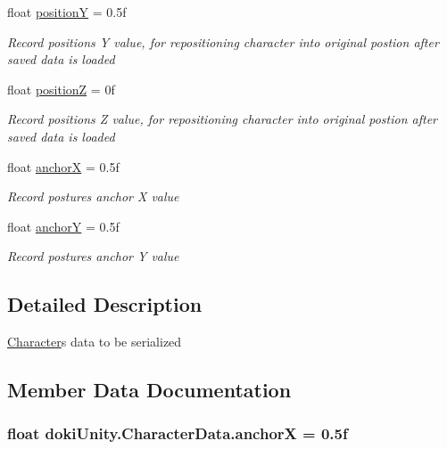 \begin{DoxyCompactItemize}
float \hyperlink{classdoki_unity_1_1_character_data_a737106f39a00a47969ef0eb9bc9ca687}{positionY} = 0.\+5f
\begin{DoxyCompactList}\small\item\em Record position\textquotesingle{}s Y value, for repositioning character into original postion after saved data is loaded \end{DoxyCompactList}\item 
float \hyperlink{classdoki_unity_1_1_character_data_a63d642bed2b900c80aa6d303782085e9}{positionZ} = 0f
\begin{DoxyCompactList}\small\item\em Record position\textquotesingle{}s Z value, for repositioning character into original postion after saved data is loaded \end{DoxyCompactList}\item 
float \hyperlink{classdoki_unity_1_1_character_data_a0a14e7430b02aa91c479c219b544b4ae}{anchorX} = 0.\+5f
\begin{DoxyCompactList}\small\item\em Record posture\textquotesingle{}s anchor X value \end{DoxyCompactList}\item 
float \hyperlink{classdoki_unity_1_1_character_data_a2051701b408778e685f524449be94ffd}{anchorY} = 0.\+5f
\begin{DoxyCompactList}\small\item\em Record posture\textquotesingle{}s anchor Y value \end{DoxyCompactList}\end{DoxyCompactItemize}


\subsection{Detailed Description}
\hyperlink{classdoki_unity_1_1_character}{Character}\textquotesingle{}s data to be serialized 



\subsection{Member Data Documentation}
\subsubsection[{\texorpdfstring{anchorX}{anchorX}}]{\setlength{\rightskip}{0pt plus 5cm}float doki\+Unity.\+Character\+Data.\+anchorX = 0.\+5f}\hypertarget{classdoki_unity_1_1_character_data_a0a14e7430b02aa91c479c219b544b4ae}{}\label{classdoki_unity_1_1_character_data_a0a14e7430b02aa91c479c219b544b4ae}


